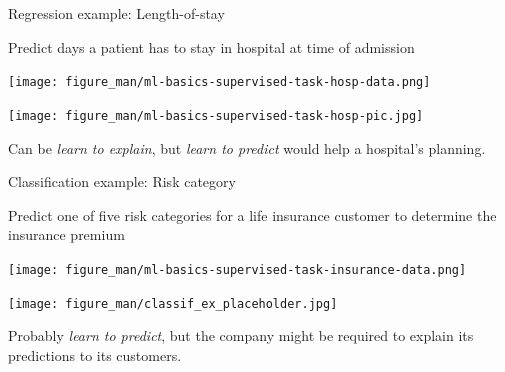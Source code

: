 \documentclass[11pt,compress,t,notes=noshow, xcolor=table]{beamer}
\begin{document}

\begin{vbframe}{Regression example: Length-of-stay}
  
  Predict days a patient has to stay in hospital at time of admission
       
    
    \begin{center}
    \texttt{[image: figure\_man/ml-basics-supervised-task-hosp-data.png]} 
    
    \lz
    
    \texttt{[image: figure\_man/ml-basics-supervised-task-hosp-pic.jpg]} 
    
    \end{center}
    
    Can be \textit{learn to explain}, but \textit{learn to predict} would help
    a hospital's planning. 
  
  

\end{vbframe}


\begin{vbframe}{Classification example: Risk category}

  Predict one of five risk categories for a life insurance customer to determine the insurance premium 
\begin{center}

    \texttt{[image: figure\_man/ml-basics-supervised-task-insurance-data.png]} 

\lz

  \texttt{[image: figure\_man/classif\_ex\_placeholder.jpg]} 
\end{center}

Probably \textit{learn to predict}, but the company might be required to explain
its predictions to its customers.

\end{vbframe}


\endlecture
\end{document}
